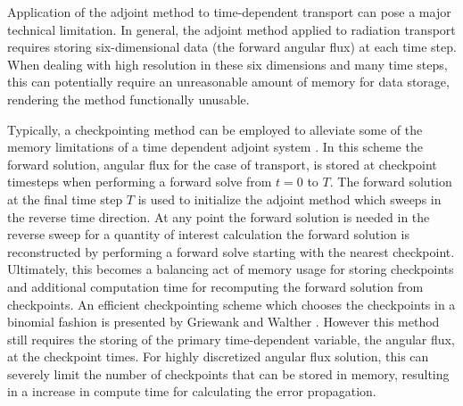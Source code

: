 \documentclass[12pt]{report}
\begin{document}
Application of the adjoint method to time-dependent transport can pose a major technical limitation. In general, the adjoint method applied to radiation transport requires storing six-dimensional data (the forward angular flux) at each time step. When dealing with high resolution in these six dimensions and many time steps, this can potentially require an unreasonable amount of memory for data storage, rendering the method functionally unusable. 

Typically, a checkpointing method can be employed to alleviate some of the memory limitations of a time dependent adjoint system \cite{Carey} \cite{Griewank}. In this scheme the forward solution, angular flux for the case of transport, is stored at checkpoint timesteps when performing a forward solve from $t=0$ to $T$. The forward solution at the final time step $T$ is used to initialize the adjoint method which sweeps in the reverse time direction. At any point the forward solution is needed in the reverse sweep for a quantity of interest calculation the forward solution is reconstructed by performing a forward solve starting with the nearest checkpoint. Ultimately, this becomes a balancing act of memory usage for storing checkpoints and additional computation time for recomputing the forward solution from checkpoints. An efficient checkpointing scheme which chooses the checkpoints in a binomial fashion is presented by Griewank and Walther \cite{Griewank}. However this method still requires the storing of the primary time-dependent variable, the angular flux, at the checkpoint times. For highly discretized angular flux solution, this can severely limit the number of checkpoints that can be stored in memory, resulting in a increase in compute time for calculating the error propagation.

\end{document}
